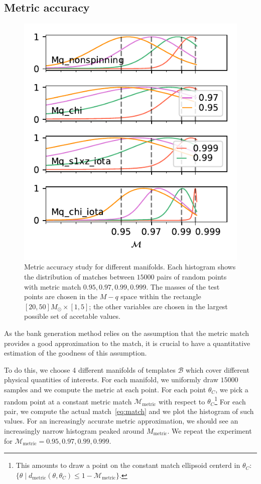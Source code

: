 \documentclass[twocolumn,showpacs,preprintnumbers,nofootinbib,prd,
superscriptaddress,10pt]{revtex4-2}
\begin{document}
\subsection{Metric accuracy} \label{sec:metric_accuracy}

\begin{figure}[t]
	\centering
	\includegraphics{metric_accuracy_hessian}
	\caption{Metric accuracy study for different manifolds.
	Each histogram shows the distribution of matches between $15000$ pairs of random points with metric match $0.95, 0.97, 0.99, 0.999$. The masses of the test points are chosen in the $M-q$ space within the rectangle ${[20, 50] M_\odot \times [1,5]}$; the other variables are chosen in the largest possible set of accetable values.}
	\label{fig:metric_accuracy}
\end{figure}

As the bank generation method relies on the assumption that the metric match provides a good approximation to the match, it is crucial to have a quantitative estimation of the goodness of this assumption.

To do this, we choose 4 different manifolds of templates $\mathcal{B}$ which cover different physical quantities of interests. For each manifold, we uniformly draw $15000$ samples and we compute the metric at each point.
For each point $\theta_C$, we pick a random point at a constant metric match $\mathcal{M}_{\text{metric}}$ with respect to $\theta_C$\footnote{
This amounts to draw a point on the constant match ellipsoid centerd in
$\theta_C$: $\{\theta \; | \; d_{\text{metric}}(\theta,\theta_C) \leq 1-\mathcal{M}_{\text{metric}} \}$.
}
For each pair, we compute the actual match~\eqref{eq:match} and we plot the histogram of such values. For an increasingly accurate metric approximation, we should see an increasingly narrow histogram peaked around $M_{\text{metric}}$.
We repeat the experiment for $\mathcal{M}_{\text{metric}} = 0.95, 0.97, 0.99, 0.999$.
\end{document}
